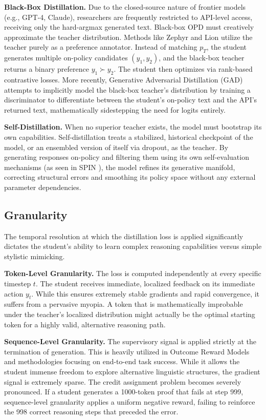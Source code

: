 \documentclass{article} %
\newcommand{\pteacher}{p_T}
\begin{document}
\textbf{Black-Box Distillation.} Due to the closed-source nature of frontier models (e.g., GPT-4, Claude), researchers are frequently restricted to API-level access, receiving only the hard-argmax generated text. Black-box OPD must creatively approximate the teacher distribution. Methods like Zephyr \citep{2310.06694} and Lion \citep{2310.01382} utilize the teacher purely as a preference annotator. Instead of matching $\pteacher$, the student generates multiple on-policy candidates $(y_1, y_2)$, and the black-box teacher returns a binary preference $y_1 \succ y_2$. The student then optimizes via rank-based contrastive losses. More recently, Generative Adversarial Distillation (GAD) \citep{2511.10643} attempts to implicitly model the black-box teacher's distribution by training a discriminator to differentiate between the student's on-policy text and the API's returned text, mathematically sidestepping the need for logits entirely.

\textbf{Self-Distillation.} When no superior teacher exists, the model must bootstrap its own capabilities. Self-distillation treats a stabilized, historical checkpoint of the model, or an ensembled version of itself via dropout, as the teacher. By generating responses on-policy and filtering them using its own self-evaluation mechanisms (as seen in SPIN \citep{2401.01335}), the model refines its generative manifold, correcting structural errors and smoothing its policy space without any external parameter dependencies.

\subsection{Granularity}
\label{subsec:tax_granularity}

The temporal resolution at which the distillation loss is applied significantly dictates the student's ability to learn complex reasoning capabilities versus simple stylistic mimicking.

\textbf{Token-Level Granularity.} The loss is computed independently at every specific timestep $t$. The student receives immediate, localized feedback on its immediate action $y_t$. While this ensures extremely stable gradients and rapid convergence, it suffers from a pervasive myopia. A token that is mathematically improbable under the teacher's localized distribution might actually be the optimal starting token for a highly valid, alternative reasoning path.

\textbf{Sequence-Level Granularity.} The supervisory signal is applied strictly at the termination of generation. This is heavily utilized in Outcome Reward Models and methodologies focusing on end-to-end task success. While it allows the student immense freedom to explore alternative linguistic structures, the gradient signal is extremely sparse. The credit assignment problem becomes severely pronounced. If a student generates a 1000-token proof that fails at step 999, sequence-level granularity applies a uniform negative reward, failing to reinforce the 998 correct reasoning steps that preceded the error.
\end{document}
